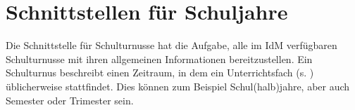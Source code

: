 \section{Schnittstellen für Schuljahre}
Die Schnittstelle für Schulturnusse hat die Aufgabe, alle im IdM verfügbaren Schulturnusse mit ihren allgemeinen Informationen bereitzustellen. Ein Schulturnus beschreibt einen Zeitraum, in dem ein Unterrichtsfach (s. ) üblicherweise stattfindet. Dies können zum Beispiel Schul(halb)jahre, aber auch Semester oder Trimester sein.



%

%
%